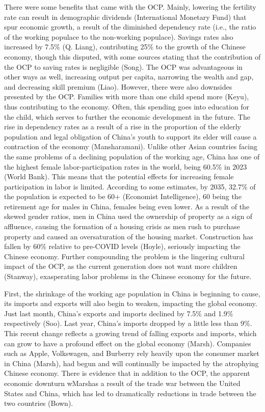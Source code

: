 \documentclass[12pt, a4paper, twoside]{article}
\begin{document}
There were some benefits that came with the OCP. Mainly, lowering the fertility rate can result in demographic dividends (International Monetary Fund) that spur economic growth, a result of the diminished dependency rate (i.e., the ratio of the working populace to the non-working populace). Savings rates also increased by 7.5\% (Q. Liang), contributing 25\% to the growth of the Chinese economy, though this disputed, with some sources stating that the contribution of the OCP to saving rates is negligible (Song). The OCP was advantageous in other ways as well, increasing output per capita, narrowing the wealth and gap, and decreasing skill premium (Liao). However, there were also downsides presented by the OCP.  Families with more than one child spend more (Keyu), thus contributing to the economy. Often, this spending goes into education for the child, which serves to further the economic development in the future. The rise in dependency rates as a result of a rise in the proportion of the elderly population and legal obligation of China’s youth to support its elder will cause a contraction of the economy (Mansharamani). Unlike other Asian countries facing the same problems of a declining population of the working age, China has one of the highest female labor-participation rates in the world, being 60.5\% in 2023 (World Bank). This means that the potential effects for increasing female participation in labor is limited. According to some estimates, by 2035, 32.7\% of the population is expected to be 60+ (Economist Intelligence), 60 being the retirement age for males in China, females being even lower. As a result of the skewed gender ratios, men in China used the ownership of property as a sign of affluence, causing the formation of a housing crisis as men rush to purchase property and caused an oversaturation of the housing market. Construction has fallen by 60\% relative to pre-COVID levels (Hoyle), seriously impacting the Chinese economy. Further compounding the problem is the lingering cultural impact of the OCP, as the current generation does not want more children (Stanway), exasperating labor problems in the Chinese economy for the future. 

First, the shrinkage of the working age population in China is beginning to cause, its imports and exports will also begin to weaken, impacting the global economy. Just last month, China’s exports and imports declined by 7.5\% and 1.9\% respectively (Soo). Last year, China’s imports dropped by a little less than 9\%. This recent change reflects a growing trend of falling exports and imports, which can grow to have a profound effect on the global economy (Marsh). Companies such as Apple, Volkswagen, and Burberry rely heavily upon the consumer market in China (Marsh), had begun and will continually be impacted by the atrophying Chinese economy. There is evidence that in addition to the OCP, the apparent economic downturn wMarshas a result of the trade war between the United States and China, which has led to dramatically reductions in trade between the two countries (Bown).  
\end{document}
